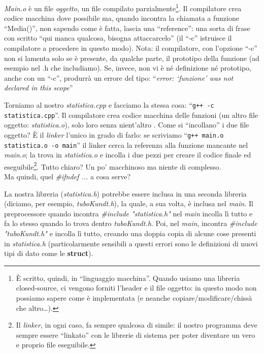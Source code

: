 \emph{Main.o} è un file \emph{oggetto}, un file compilato parzialmente\footnote{È scritto, quindi, in ``linguaggio macchina''. Quando usiamo una libreria closed-source, ci vengono forniti l'header e il file oggetto: in questo modo non possiamo sapere come è implementata (e neanche copiare/modificare/chissà che altro\ldots).}. Il compilatore crea codice macchina dove possibile ma, quando incontra la chiamata a funzione ``Media()'', non sapendo come è fatta, lascia una ``reference'': una sorta di frase con scritto ``qui manca qualcosa, bisogna attaccarcelo'' (il ``-c'' istruisce il compilatore a procedere in questo modo). Nota: il compilatore, con l'opzione ``-c'' non si lamenta solo se è presente, da qualche parte, il prototipo della funzione (ad esempio nel .h che includiamo). Se, invece, non vi è né definizione né prototipo, anche con un ``-c'', produrrà un errore del tipo: ``\emph{error: ‘funzione’ was not declared in this scope}'' 

Torniamo al nostro \emph{statistica.cpp} e facciamo la stessa cosa: ``\verb|g++ -c statistica.cpp|''. Il compilatore crea codice macchina delle funzioni (un altro file oggetto: \emph{statistica.o}), solo loro senza nient'altro . Come si ``incollano'' i due file oggetto? È il \emph{linker} l'unico in grado di farlo: se scriviamo ``\verb|g++ main.o statistica.o -o main|'' il linker cerca la referenza alla funzione mancante nel \emph{main.o}; la trova in \emph{statistica.o} e incolla i due pezzi per creare il codice finale ed eseguibile\footnote{Il \emph{linker}, in ogni caso, fa sempre qualcosa di simile: il nostro programma deve sempre essere ``linkato'' con le librerie di sistema per poter diventare un vero e proprio file eseguibile.}. Tutto chiaro? Un po' macchinoso ma niente di complesso.\\

Ma quindi, quel \emph{\#ifndef ...} a cosa serve?

La nostra libreria (\emph{statistica.h}) potrebbe essere inclusa in una seconda libreria (diciamo, per esempio, \emph{tuboKundt.h}), la quale, a sua volta, è inclusa nel \emph{main}. Il preprocessore quando incontra \emph{\#include "statistica.h"} nel \emph{main} incolla lì tutto e fa lo stesso quando lo trova dentro \emph{tuboKundt.h}. Poi, nel \emph{main}, incontra \emph{\#include "tuboKundt.h"} e incolla lì tutto, creando una doppia copia di alcune cose presenti in \emph{statistica.h} (particolarmente sensibili a questi errori sono le definizioni di nuovi tipi di dato come le \textbf{struct}). 


